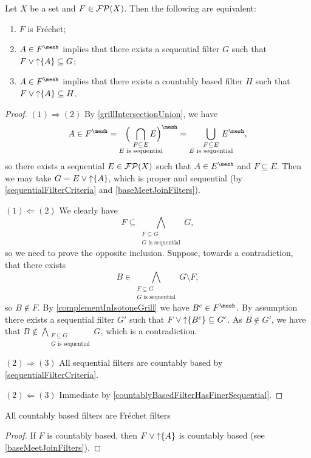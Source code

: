 \begin{proposition}
Let $X$ be a set and $F\in\operatorname{\mathcal{FP}}(X)$. Then the following are equivalent:
\begin{enumerate}
\item $F$ is Fréchet;
\item $A\in F^\mesh$ implies that there exists a sequential filter $G$ such that $F\vee \operatorname{\uparrow}\{A\} \subseteq G$;
\item $A\in F^\mesh$ implies that there exists a countably based filter $H$ such that $F\vee \operatorname{\uparrow}\{A\} \subseteq H$.
\end{enumerate}
\end{proposition}
\begin{proof}
$(1) \Rightarrow (2)$ By \ref{grillIntersectionUnion}, we have
\[ A\in F^\mesh = \hspace{0.7em} \Big( \hspace{-1.5em} \bigcap_{\substack{F\subseteq E \\ \text{$E$ is sequential}}} \hspace{-1.7em} E\Big)^\mesh = \bigcup_{\substack{F\subseteq E \\ \text{$E$ is sequential}}} \hspace{-1.5em} E^\mesh, \]
so there exists a sequential $E\in\operatorname{\mathcal{FP}}(X)$ such that $A\in E^\mesh$ and $F\subseteq E$. Then we may take $G = E\vee \operatorname{\uparrow}\{A\}$, which is proper and sequential (by \ref{sequentialFilterCriteria} and \ref{baseMeetJoinFilters}).

$(1) \Leftarrow (2)$ We clearly have
\[ F \subseteq \bigwedge_{\substack{F\subseteq G \\ \text{$G$ is sequential}}}G, \]
so we need to prove the opposite inclusion. Suppose, towards a contradiction, that there exists
\[ B \in \bigwedge_{\substack{F\subseteq G \\ \text{$G$ is sequential}}} G \setminus F, \]
so $B\notin F$. By \ref{complementInIsotoneGrill} we have $B^c\in F^\mesh$. By assumption there exists a sequential filter $G'$ such that $F\vee \operatorname{\uparrow}\{B^c\} \subseteq G'$. As $B\notin G'$, we have that $B\notin \bigwedge_{\substack{F\subseteq G \\ \text{$G$ is sequential}}} G$, which is a contradiction.

$(2) \Rightarrow (3)$ All sequential filters are countably based by \ref{sequentialFilterCriteria}.

$(2) \Leftarrow (3)$ Immediate by \ref{countablyBasedFilterHasFinerSequential}.
\end{proof}
\begin{corollary} \label{countablyBasedFiltersFrechet}
All countably based filters are Fréchet filters
\end{corollary}
\begin{proof}
If $F$ is countably based, then $F\vee \operatorname{\uparrow}\{A\}$ is countably based (see \ref{baseMeetJoinFilters}).
\end{proof}

